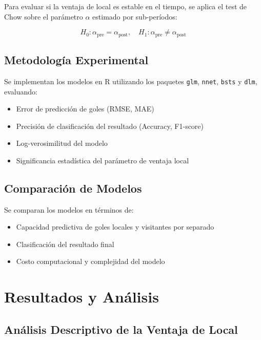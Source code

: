 \documentclass[a4paper,12pt]{article}
\begin{document}
Para evaluar si la ventaja de local es estable en el tiempo, se aplica el test de Chow sobre el parámetro $\alpha$ estimado por sub-períodos:

\begin{equation}
H_0: \alpha_{\text{pre}} = \alpha_{\text{post}}, \quad H_1: \alpha_{\text{pre}} \neq \alpha_{\text{post}}
\end{equation}

\subsection{Metodología Experimental}

Se implementan los modelos en R utilizando los paquetes \texttt{glm}, \texttt{nnet}, \texttt{bsts} y \texttt{dlm}, evaluando:

\begin{itemize}
    \item Error de predicción de goles (RMSE, MAE)
    \item Precisión de clasificación del resultado (Accuracy, F1-score)
    \item Log-verosimilitud del modelo
    \item Significancia estadística del parámetro de ventaja local
\end{itemize}

\subsection{Comparación de Modelos}

Se comparan los modelos en términos de:

\begin{itemize}
    \item Capacidad predictiva de goles locales y visitantes por separado
    \item Clasificación del resultado final
    \item Costo computacional y complejidad del modelo
\end{itemize}

\section{Resultados y Análisis}

\subsection{Análisis Descriptivo de la Ventaja de Local}
\end{document}

